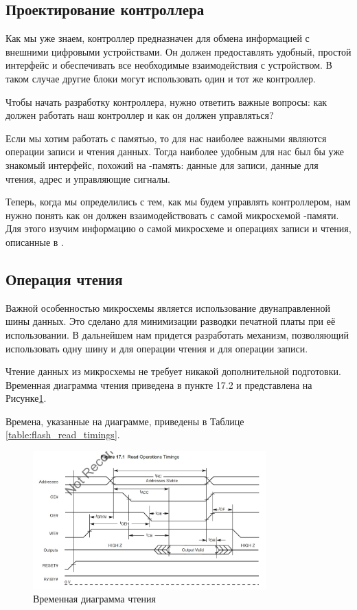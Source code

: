 \subsection{Проектирование контроллера }
\par{Как мы уже знаем, контроллер предназначен для обмена информацией с внешними цифровыми устройствами. Он должен предоставлять удобный, простой интерфейс и обеспечивать все необходимые взаимодействия с устройством. В таком случае другие блоки могут использовать один и тот же контроллер.} 
\par{Чтобы начать разработку контроллера, нужно ответить важные вопросы: как должен работать наш контроллер и как он должен управляться?}
\par{Если мы хотим работать с памятью, то для нас наиболее важными являются операции записи и чтения данных.  Тогда наиболее удобным для нас был бы уже знакомый интерфейс, похожий на -память: данные для записи, данные для чтения, адрес и управляющие сигналы.}
\par{Теперь, когда мы определились с тем, как мы будем управлять контроллером, нам нужно понять как он должен взаимодействовать с самой микросхемой -памяти. Для этого изучим информацию о самой микросхеме и  операциях записи и чтения, описанные в .}

\subsection{Операция чтения}
\par{Важной особенностью микросхемы  является использование двунаправленной шины данных. Это сделано для минимизации разводки печатной платы при её использовании. В дальнейшем нам придется разработать механизм, позволяющий использовать одну шину и для операции чтения и для операции записи.}
\par{Чтение данных из микросхемы  не требует никакой дополнительной подготовки. Временная диаграмма чтения приведена в пункте 17.2  и представлена на Рисунке\ref{fig:flash_read_op}.}
\par{Времена, указанные на диаграмме, приведены в Таблице \ref{table:flash_read_timings}.}

\begin{figure}[H]
\centering
% 
\includegraphics[width=0.8\textwidth]{./images/lab_6/flash_read_op}
\caption{Временная диаграмма чтения }
\label{fig:flash_read_op}
\end{figure}

